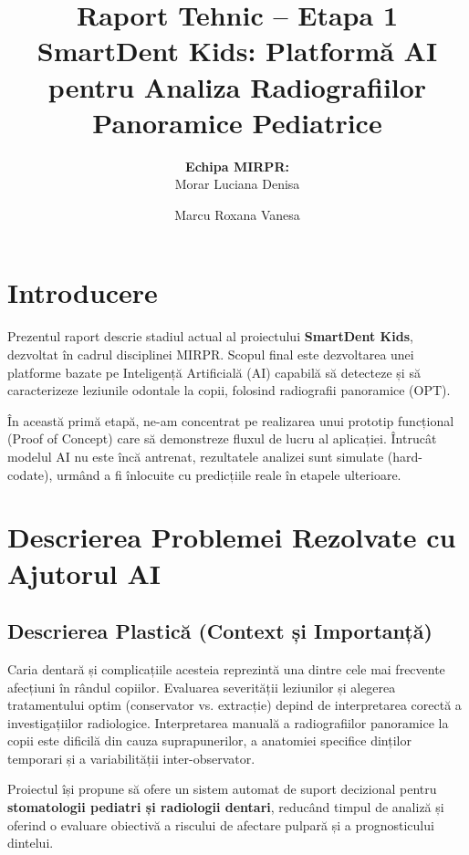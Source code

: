 \documentclass[12pt,a4paper]{article}
\title{\textbf{Raport Tehnic -- Etapa 1}\\
\large SmartDent Kids: Platformă AI pentru Analiza Radiografiilor Panoramice Pediatrice}
\author{
    \textbf{Echipa MIRPR:} \\
    Morar Luciana Denisa \and Marcu Roxana Vanesa
}
\date{}
\begin{document}
\maketitle

\section{Introducere}
Prezentul raport descrie stadiul actual al proiectului \textbf{SmartDent Kids}, dezvoltat în cadrul disciplinei MIRPR. Scopul final este dezvoltarea unei platforme bazate pe Inteligență Artificială (AI) capabilă să detecteze și să caracterizeze leziunile odontale la copii, folosind radiografii panoramice (OPT).

În această primă etapă, ne-am concentrat pe realizarea unui prototip funcțional (Proof of Concept) care să demonstreze fluxul de lucru al aplicației. Întrucât modelul AI nu este încă antrenat, rezultatele analizei sunt simulate (hard-codate), urmând a fi înlocuite cu predicțiile reale în etapele ulterioare.

\section{Descrierea Problemei Rezolvate cu Ajutorul AI}

\subsection{Descrierea Plastică (Context și Importanță)}
Caria dentară și complicațiile acesteia reprezintă una dintre cele mai frecvente afecțiuni în rândul copiilor. Evaluarea severității leziunilor și alegerea tratamentului optim (conservator vs. extracție) depind de interpretarea corectă a investigațiilor radiologice. Interpretarea manuală a radiografiilor panoramice la copii este dificilă din cauza suprapunerilor, a anatomiei specifice dinților temporari și a variabilității inter-observator.

Proiectul își propune să ofere un sistem automat de suport decizional pentru \textbf{stomatologii pediatri și radiologii dentari}, reducând timpul de analiză și oferind o evaluare obiectivă a riscului de afectare pulpară și a prognosticului dintelui.
\end{document}
